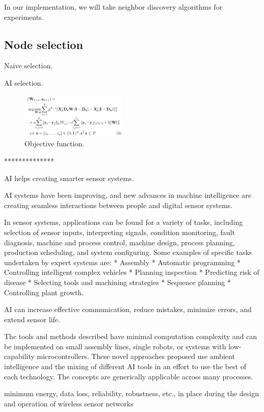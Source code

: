 In our implementation, we will take neighbor discovery algorithms for experiments.
\fi



\subsection{Node selection}

Naive selection.

AI selection.

\begin{figure}[htbp]
	\centering
	\includegraphics[width=2in]{Figure/OF}
	\caption{Objective function.}
	\label{system}
\end{figure}


**************

AI helps creating smarter sensor systems.

AI systems have been improving, and new advances in machine intelligence are creating seamless interactions between people and digital sensor systems.

 In sensor systems, applications can be found for a variety of tasks, including selection of sensor inputs, interpreting signals, condition monitoring, fault diagnosis, machine and process control, machine design, process planning, production scheduling, and system configuring. Some examples of specific tasks undertaken by expert systems are:
* Assembly 
* Automatic programming 
* Controlling intelligent complex vehicles  
* Planning inspection 
* Predicting risk of disease 
* Selecting tools and machining strategies 
* Sequence planning 
* Controlling plant growth. 

AI can increase effective communication, reduce mistakes, minimize errors, and extend sensor life.



The tools and methods described have minimal computation complexity and can be implemented on small assembly lines, single robots, or systems with low-capability microcontrollers. These novel approaches proposed use ambient intelligence and the mixing of different AI tools in an effort to use the best of each technology. The concepts are generically applicable across many processes.


minimum energy, data loss, reliability, robustness, etc., in place during the design and operation of wireless sensor networks

